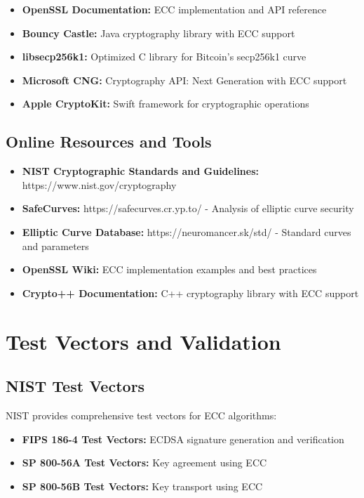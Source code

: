 \documentclass[11pt,a4paper]{article}
\begin{document}
\begin{itemize}
    \item \textbf{OpenSSL Documentation:} ECC implementation and API reference
    \item \textbf{Bouncy Castle:} Java cryptography library with ECC support
    \item \textbf{libsecp256k1:} Optimized C library for Bitcoin's secp256k1 curve
    \item \textbf{Microsoft CNG:} Cryptography API: Next Generation with ECC support
    \item \textbf{Apple CryptoKit:} Swift framework for cryptographic operations
\end{itemize}

\subsection{Online Resources and Tools}

\begin{itemize}
    \item \textbf{NIST Cryptographic Standards and Guidelines:} https://www.nist.gov/cryptography
    \item \textbf{SafeCurves:} https://safecurves.cr.yp.to/ - Analysis of elliptic curve security
    \item \textbf{Elliptic Curve Database:} https://neuromancer.sk/std/ - Standard curves and parameters
    \item \textbf{OpenSSL Wiki:} ECC implementation examples and best practices
    \item \textbf{Crypto++ Documentation:} C++ cryptography library with ECC support
\end{itemize}

\section{Test Vectors and Validation}

\subsection{NIST Test Vectors}

NIST provides comprehensive test vectors for ECC algorithms:

\begin{itemize}
    \item \textbf{FIPS 186-4 Test Vectors:} ECDSA signature generation and verification
    \item \textbf{SP 800-56A Test Vectors:} Key agreement using ECC
    \item \textbf{SP 800-56B Test Vectors:} Key transport using ECC
\end{itemize}
\end{document}
